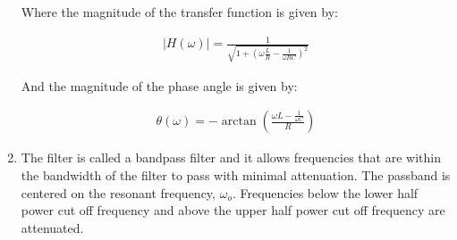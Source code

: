\documentclass{article}
\begin{document}
\begin{enumerate}
	Where the magnitude of the transfer function is given by:
	
	\begin{align*}
		|H(\omega)| = \frac{1}{\sqrt{1 + (\omega \frac{L}{R} - \frac{1}{\omega RC})^2}}
	\end{align*}
	
	And the magnitude of the phase angle is given by:
	
	\begin{align*}
		\theta(\omega) = -\arctan(\frac{\omega L - \frac{1}{\omega C}}{R})
	\end{align*}
	
	\item
	
	The filter is called a bandpass filter and it allows frequencies that are within the bandwidth of the filter to pass with minimal attenuation. The passband is centered on the resonant frequency, $\omega_o$. Frequencies below the lower half power cut off frequency and above the upper half power cut off frequency are attenuated.
	
\end{enumerate}
\end{document}
